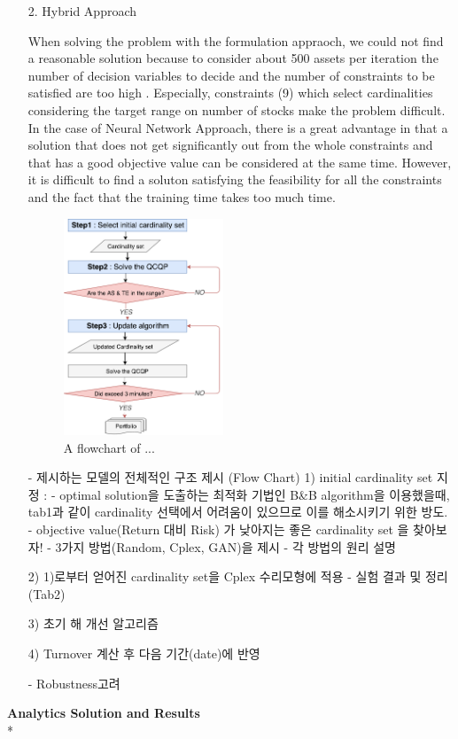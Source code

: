 \documentclass[11pt]{article}
\begin{document}
\begin{itemize}
	
\item[2.] Hybrid Approach %

When solving the problem with the formulation appraoch, we could not find a reasonable solution because to consider about 500 assets per iteration the number of decision variables to decide and the number of constraints to be satisfied are too high . Especially, constraints (9) which select cardinalities considering the target range on number of stocks make the problem difficult. 
In the case of Neural Network Approach, there is a great advantage in that a solution that does not get significantly out from the whole constraints and that has a good objective value can be considered at the same time. However, it is difficult to find a soluton satisfying the feasibility for all the constraints and the fact that the training time takes too much time.

\begin{figure}[h] 
	\begin{center}
		\includegraphics[width=0.45\textwidth]{flowchart}
		\caption{A flowchart of ...} \label{fig:flowchart}
	\end{center}
\end{figure}
	
	- 제시하는 모델의 전체적인 구조 제시 (Flow Chart)
	1) initial cardinality set 지정 : 
	- optimal solution을 도출하는 최적화 기법인 B&B algorithm을 이용했을때, tab1과 같이 cardinality 선택에서 어려움이 있으므로 이를 해소시키기 위한 방도. 
	- objective value(Return 대비 Risk) 가 낮아지는 좋은 cardinality set 을 찾아보자!
	- 3가지 방법(Random, Cplex, GAN)을 제시
	- 각 방법의 원리 설명
	
	
	2) 1)로부터 얻어진 cardinality set을 Cplex 수리모형에 적용 
	- 실험 결과 및 정리 (Tab2)
	
	3) 초기 해 개선 알고리즘
	
	4) Turnover 계산 후 다음 기간(date)에 반영
	
	
	- Robustness고려
	


\end{itemize}
\textbf{Analytics Solution and Results}\\*
\end{document}
